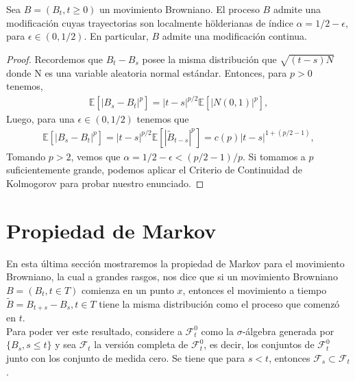 \begin{corollary}
Sea $B = (B_t, t \geq 0)$ un movimiento Browniano. El proceso $B$ admite una modificación cuyas trayectorias son localmente hölderianas de índice $\alpha = 1/2 - \epsilon$, para $\epsilon \in (0, 1/2)$. En particular, $B$ admite una modificación continua.
\end{corollary}
\begin{proof}
Recordemos que $B_t - B_s$ posee la misma distribución que $\sqrt{(t - s) N}$ donde N es una variable aleatoria normal estándar. Entonces, para $p > 0$ tenemos,
	\begin{align*}
	\mathbb{E} \left[ |B_s - B_t|^p \right] = |t-s|^{p/2} \mathbb{E} \left[ |N(0, 1)|^p \right],
	\end{align*}
Luego, para una $\epsilon \in (0, 1/2)$ tenemos que 
	\begin{align*}
	\mathbb{E} \left[ |B_s - B_t|^p \right] = |t-s|^{p/2} \mathbb{E} \left[ |\tilde{B}_{t-s}|^p \right] = c(p) |t-s|^{1 + (p/2 -1)},
	\end{align*}
Tomando $p > 2$, vemos que $\alpha = 1/2 - \epsilon < (p/2 - 1)/p$. Si tomamos a $p$ suficientemente grande, podemos aplicar el Criterio de Continuidad de Kolmogorov para probar nuestro enunciado.
\end{proof}

\section{Propiedad de Markov}
En esta última sección mostraremos la propiedad de Markov para el movimiento Browniano, la cual a grandes rasgos, nos dice que si un movimiento Browniano $B = (B_t, t \in T)$ comienza en un punto $x$, entonces el movimiento a tiempo $\tilde{B} = B_{t+s} - B_s, t \in T$ tiene la misma distribución como el proceso que comenzó en $t$. \\

Para poder ver este resultado, considere a $\mathcal{F}_t^0$ como la $\sigma$-álgebra generada por $\{ B_s, s \leq t \}$ y sea $\mathcal{F}_t$ la versión completa de $\mathcal{F}_t^0$, es decir, los conjuntos de $\mathcal{F}_t^0$ junto con los conjunto de medida cero. Se tiene que para $s < t$, entonces $\mathcal{F}_s \subset \mathcal{F}_t$. \\

